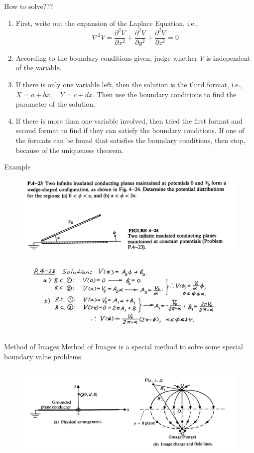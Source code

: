 \documentclass[xcolor={dvipsnames}]{beamer}
\begin{document}
\begin{frame}
\begin{block}{How to solve???}
\begin{enumerate}
	\item First, write out the expansion of the Laplace Equation, i.e.,
	$$\nabla^2 V=\frac{\partial^2 V}{\partial x^2}+\frac{\partial^2 V}{\partial y^2}+\frac{\partial^2 V}{\partial z^2}=0$$
	\item According to the boundary conditions given, judge whether $V$ is independent of the variable. 
	\item If there is only one variable left, then the solution is the third format, i.e., $X=a+bx,\quad Y=c+dx$. Then use the boundary conditions to find the parameter of the solution.
	\item If there is more than one variable involved, then tried the first format and second format to find if they can satisfy the boundary conditions. If one of the formats can be found that satisfies the boundary conditions, then stop, because of the uniqueness theorem.
\end{enumerate}
\end{block}
\end{frame}
\begin{frame}{Example}
\begin{figure}
	\centering
	\includegraphics[width=0.8\linewidth]{5_16.png}
\end{figure}
\pause
\begin{figure}
	\centering
	\includegraphics[width=0.8\linewidth]{5_17.png}
\end{figure}
\end{frame}
\begin{frame}{Method of Images}
Method of Images is a special method to solve some special boundary value problems.
\begin{figure}
	\centering
	\includegraphics[width=0.8\linewidth]{6_1.png}
\end{figure}
\end{frame}
\end{document}
